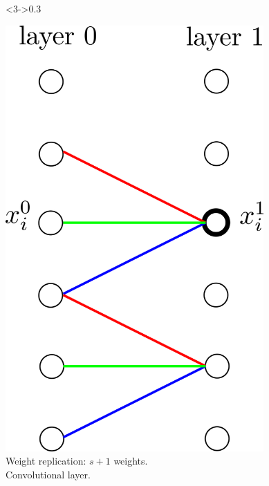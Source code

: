 \documentclass[xcolor=pdftex,dvipsnames,table,mathserif]{beamer}
\begin{document}
{\begin{columns}
    \begin{column}<3->{0.3\textwidth}
      \begin{center}
        \includegraphics[width=0.74\textwidth]{convolutional_layer.png}
        \\ \scriptsize{Weight replication: $s+1$ weights.\\
          \alert{Convolutional layer.}}
      \end{center}
    \end{column}

  \end{columns}



}
\end{document}
